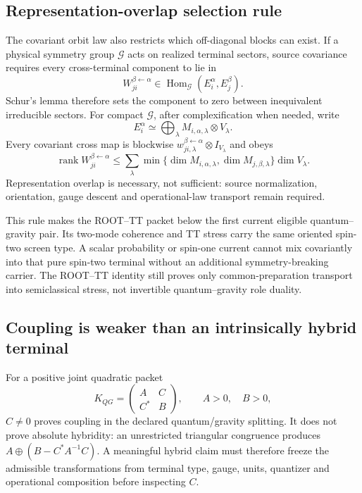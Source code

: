 \subsection{Representation-overlap selection rule}

The covariant orbit law also restricts which off-diagonal blocks can exist.
If a physical symmetry group $\mathcal G$ acts on realized terminal sectors,
source covariance requires every cross-terminal component to lie in
\begin{equation}
 W_{ji}^{\beta\leftarrow\alpha}
 \in\operatorname{Hom}_{\mathcal G}(E_i^\alpha,E_j^\beta).
 \label{eq:terminalintertwiner}
\end{equation}
Schur's lemma therefore sets the component to zero between inequivalent
irreducible sectors. For compact $\mathcal G$, after complexification when
needed, write
\begin{equation}
 E_i^\alpha\simeq\bigoplus_\lambda
 M_{i,\alpha,\lambda}\otimes V_\lambda.
\end{equation}
Every covariant cross map is blockwise
$w_{ji,\lambda}^{\beta\leftarrow\alpha}\otimes I_{V_\lambda}$ and obeys
\begin{equation}
 \operatorname{rank} W_{ji}^{\beta\leftarrow\alpha}
 \leq\sum_\lambda
 \min\{\dim M_{i,\alpha,\lambda},\dim M_{j,\beta,\lambda}\}
 \dim V_\lambda.
 \label{eq:representationrankbound}
\end{equation}
Representation overlap is necessary, not sufficient: source normalization,
orientation, gauge descent and operational-law transport remain required.

This rule makes the ROOT--TT packet below the first current eligible
quantum--gravity pair. Its two-mode coherence and TT stress carry the same
oriented spin-two screen type. A scalar probability or spin-one current cannot
mix covariantly into that pure spin-two terminal without an additional
symmetry-breaking carrier. The ROOT--TT identity still proves only
common-preparation transport into semiclassical stress, not invertible
quantum--gravity role duality.

\subsection{Coupling is weaker than an intrinsically hybrid terminal}

For a positive joint quadratic packet
\begin{equation}
 K_{QG}=\begin{pmatrix}A&C\\C^*&B\end{pmatrix},
 \qquad A>0,\quad B>0,
 \label{eq:hybridpacket}
\end{equation}
$C\neq0$ proves coupling in the declared quantum/gravity splitting. It does
not prove absolute hybridity: an unrestricted triangular congruence produces
$A\oplus(B-C^*A^{-1}C)$. A meaningful hybrid claim must therefore freeze the
admissible transformations from terminal type, gauge, units, quantizer and
operational composition before inspecting $C$.

